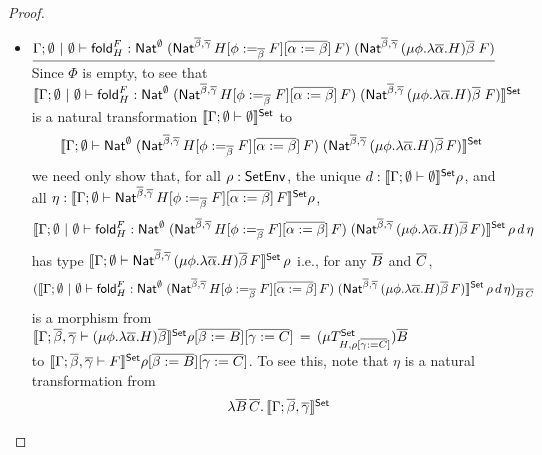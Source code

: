 \documentclass[acmsmall,review,anonymous]{acmart}
\theoremstyle{definition}
\newcommand{\set}{\mathsf{Set}}
\begin{document}
\begin{proof}
\begin{itemize}
\item
$\underline{\Gamma; \emptyset~|~\emptyset \vdash \mathsf{fold}^F_H :
  \mathsf{Nat}^\emptyset\;(\mathsf{Nat}^{\overline{\beta}, \overline{\gamma}}\,H[\phi
    :=_{\overline{\beta}} F][\overline{\alpha := \beta}]\,F)\;
  (\mathsf{Nat}^{{\overline{\beta},\overline{\gamma}} }\,(\mu \phi.\lambda \overline
  \alpha.H)\overline \beta \;F)}$ \; Since $\Phi$ is empty, to see
  that $\setsem{ \Gamma; \emptyset~|~\emptyset \vdash \fold^F_H :
    \Nat^\emptyset\;(\Nat^{\ol{\beta}, \ol{\gamma}}\,H[\phi
      :=_{\ol{\beta}} F][\ol{\alpha := \beta}]\,F)\;
    (\Nat^{{\ol{\beta},\ol{\gamma}} }\,(\mu \phi.\lambda \overline
    \alpha.H)\overline \beta \;F)}$ is a natural transformation
  $\setsem{\Gamma;\emptyset \vdash \emptyset}$ to \[\setsem{\Gamma;
    \emptyset \vdash \Nat^\emptyset\;(\Nat^{\ol{\beta},
      \ol{\gamma}}\,H[\phi :=_{\ol{\beta}} F][\ol{\alpha :=
        \beta}]\,F)\; (\Nat^{{\ol{\beta},\ol{\gamma}} }\,(\mu
    \phi.\lambda \overline \alpha.H)\overline \beta\,F)}\] we need only
  show that, for all $\rho : \mathsf{SetEnv}$, the unique $d :
  \setsem{\Gamma;\emptyset \vdash \emptyset} \rho$, and all $\eta :
  \setsem{\Gamma; \emptyset \vdash \Nat^{\ol{\beta},
      \ol{\gamma}}\,H[\phi :=_{\ol{\beta}} F][\ol{\alpha :=
        \beta}]\,F} \rho$,
\[ \setsem{\Gamma; \emptyset~|~\emptyset \vdash \fold^F_H :
  \Nat^\emptyset\;(\Nat^{\ol{\beta}, \ol{\gamma}}\,H[\phi
    :=_{\ol{\beta}} F][\ol{\alpha := \beta}]\,F)\;
  (\Nat^{{\ol{\beta},\ol{\gamma}} }\,(\mu \phi.\lambda \overline
  \alpha.H)\overline \beta\,F)}\,\rho\,d\,\eta\] has type
$\setsem{\Gamma; \emptyset \vdash \Nat^{{\ol{\beta},\ol{\gamma}}
  }\,(\mu \phi.\lambda \overline \alpha.H)\overline \beta\,F}\,\rho$
i.e., for any $\overline{B}$ and $\overline{C}$,
\[(\setsem{\Gamma; \emptyset~|~\emptyset \vdash \fold^F_H :
  \Nat^\emptyset\;(\Nat^{\ol{\beta}, \ol{\gamma}}\,H[\phi
    :=_{\ol{\beta}} F][\ol{\alpha := \beta}]\,F)\;
  (\Nat^{{\ol{\beta},\ol{\gamma}} }\,(\mu \phi.\lambda \overline
  \alpha.H)\overline \beta\,F)}\,\rho\,d\,\eta)_{\ol{B}\,\ol{C}}\] is a
morphism from $\setsem{\Gamma; \ol{\beta},\ol{\gamma} \vdash (\mu
  \phi.\lambda \overline \alpha.H)\overline \beta}\rho[\ol{\beta :=
    B}][\ol{\gamma := C}] \,=\,(\mu T^\set_{H,\rho[\ol{\gamma := C}]})
\ol{B}$\\ to $\setsem{\Gamma; \ol{\beta},\ol{\gamma} \vdash
  F}\rho[\ol{\beta := B}][\ol{\gamma := C}]$.  To see this, note
that $\eta$ is a natural transformation from
\[\begin{array}{ll}
 & \lambda \ol{B}\,\ol{C}.\,\setsem{\Gamma; \ol{\beta},\ol{\gamma}
}
\end{array}\]
\end{itemize}
\end{proof}
\end{document}
